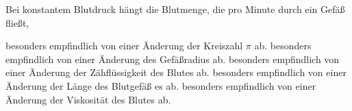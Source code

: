 \documentclass[11pt]{exam}
\begin{document}
\begin{questions}
\vspace{3mm}\question Bei konstantem Blutdruck hängt die Blutmenge, die pro Minute durch ein Gefäß fließt,

\begin{choices}
	\choice besonders empfindlich von einer Änderung der Kreiszahl \(\pi\) ab.
	\choice besonders empfindlich von einer Änderung des Gefäßradius ab.
	\choice besonders empfindlich von einer Änderung der Zähflüssigkeit des Blutes ab.
	\choice besonders empfindlich von einer Änderung der Länge des Blutgefäß es ab.
	\choice besonders empfindlich von einer Änderung der Viskosität des Blutes ab.
\end{choices}

\vspace{3mm}\end{questions}
\end{document}
